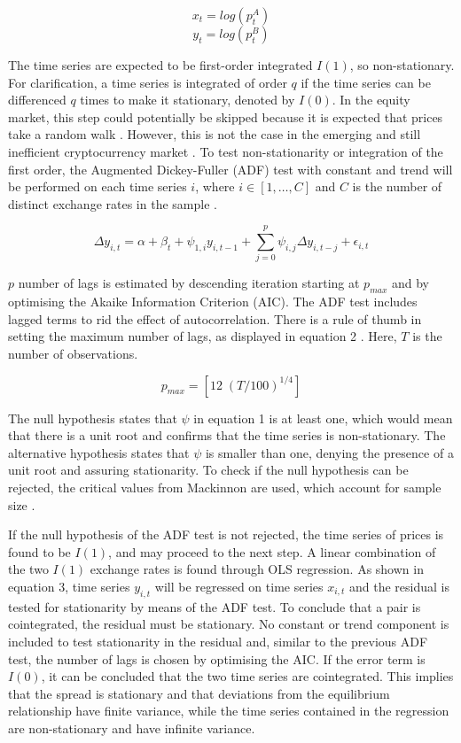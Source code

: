 \documentclass[12pt,english,authoryear]{article}
\begin{document}
$$ x_t = log(p^A_t) $$
$$ y_t = log(p^B_t) $$

The time series are expected to be first-order integrated $I(1)$, so non-stationary. For clarification, a time series is integrated of order $q$ if the time series can be differenced $q$ times to make it stationary, denoted by $I(0)$. In the equity market, this step could potentially be skipped because it is expected that prices take a random walk \cite{Fama_1995}. However, this is not the case in the emerging and still inefficient cryptocurrency market \cite{Urquhart_2016}. To test non-stationarity or integration of the first order, the Augmented Dickey-Fuller (ADF) test with constant and trend will be performed on each time series $i$, where $i \in [1,…,C]$ and $C$ is the number of distinct exchange rates in the sample \cite{Fuller_1979}.

\begin{equation} \label{eq:ADF}
\Delta y_{i, t} = \alpha + \beta_t + \psi_{1, i} y_{i,t-1} + \sum_{j=0}^p \psi_{i, j} \Delta y_{i,t-j} + \epsilon_{i,t}
\end{equation}

$p$ number of lags is estimated by descending iteration starting at $p_{max}$ and by optimising the Akaike Information Criterion (AIC). The ADF test includes lagged terms to rid the effect of autocorrelation. There is a rule of thumb in setting the maximum number of lags, as displayed in equation 2 \cite{Schwert_2002}. Here, $T$ is the number of observations.   

\begin{equation} \label{eq:ADF}
p_{max}= \left[12 \;(T/100)^{1/4}\right]
\end{equation}

The null hypothesis states that $\psi$ in equation 1 is at least one, which would mean that there is a unit root and confirms that the time series is non-stationary. The alternative hypothesis states that $\psi$ is smaller than one, denying the presence of a unit root and assuring stationarity. To check if the null hypothesis can be rejected, the critical values from Mackinnon are used, which account for sample size \cite{Mackinnon_1991}.

If the null hypothesis of the ADF test is not rejected, the time series of prices is found to be $I(1)$, and may proceed to the next step. A linear combination of the two $I(1)$ exchange rates is found through OLS regression. As shown in equation 3, time series $y_{i,t}$ will be regressed on time series $x_{i,t}$ and the residual is tested for stationarity by means of the ADF test. To conclude that a pair is cointegrated, the residual must be stationary. No constant or trend component is included to test stationarity in the residual and, similar to the previous ADF test, the number of lags is chosen by optimising the AIC. If the error term is $I(0)$, it can be concluded that the two time series are cointegrated. This implies that the spread is stationary and that deviations from the equilibrium relationship have finite variance, while the time series contained in the regression are non-stationary and have infinite variance. 
\end{document}
